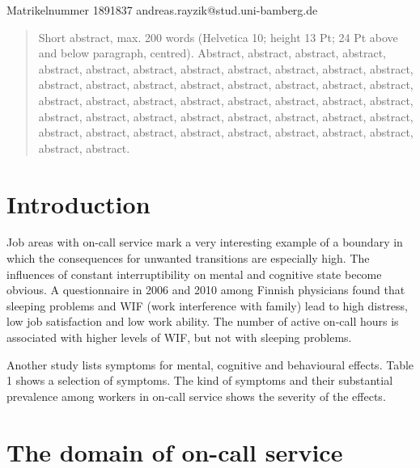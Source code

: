 \documentclass{CML_Seminar_Template}
\begin{document}

\author{Andreas Rayzik}
       {Matrikelnummer 1891837}
       {andreas.rayzik@stud.uni-bamberg.de}

\begin{abstract}
Short abstract, max. 200 words  (Helvetica 10; height 13 Pt; 24 Pt above and below paragraph, centred). Abstract, abstract, abstract, abstract, abstract, abstract, abstract, abstract, abstract, abstract, abstract, abstract, abstract, abstract, abstract, abstract, abstract, abstract, abstract, abstract, abstract, abstract, abstract, abstract, abstract, abstract, abstract, abstract, abstract, abstract, abstract, abstract, abstract, abstract, abstract, abstract, abstract, abstract, abstract, abstract, abstract, abstract, abstract, abstract, abstract, abstract. 
\end{abstract}

\vspace{24pt}

\section{Introduction}

Job areas with on-call service mark a very interesting example of a boundary in which the consequences for unwanted transitions are especially high. The influences of constant interruptibility on mental and cognitive state become obvious. A questionnaire in 2006 and 2010 among Finnish physicians found that sleeping problems and WIF (work interference with family) lead to high distress, low job satisfaction and low work ability. The number of active on-call hours is associated with higher levels of WIF, but not with sleeping problems.
\par
Another study lists symptoms for mental, cognitive and behavioural effects. Table 1 shows a selection of symptoms. The kind of symptoms and their substantial prevalence among workers in on-call service shows the severity of the effects.

\section{The domain of on-call service}
\end{document}
